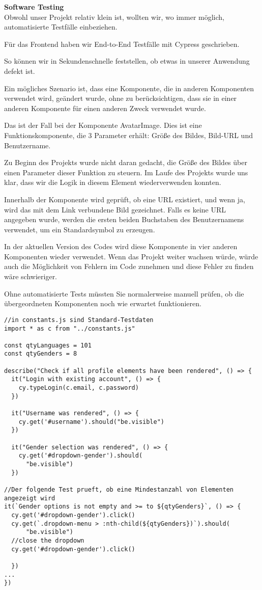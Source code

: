 \textbf{Software Testing }\\
Obwohl unser Projekt relativ klein ist, wollten wir, wo immer möglich, automatisierte Testfälle einbeziehen.

Für das Frontend haben wir End-to-End Testfälle mit Cypress geschrieben.

So können wir in Sekundenschnelle feststellen, ob etwas in unserer Anwendung defekt ist.

Ein mögliches Szenario ist, dass eine Komponente, die in anderen Komponenten verwendet wird, geändert wurde, ohne zu berücksichtigen, dass sie in einer anderen Komponente für einen anderen Zweck verwendet wurde.

Das ist der Fall bei der Komponente AvatarImage.
Dies ist eine Funktionskomponente, die 3 Parameter erhält: Größe des Bildes, Bild-URL und Benutzername.

Zu Beginn des Projekts wurde nicht daran gedacht, die Größe des Bildes über einen Parameter dieser Funktion zu steuern. Im Laufe des Projekts wurde uns klar, dass wir die Logik in diesem Element wiederverwenden konnten.

Innerhalb der Komponente wird geprüft, ob eine URL existiert, und wenn ja, wird das mit dem Link verbundene Bild gezeichnet. Falls es keine URL  angegeben wurde, werden die ersten beiden Buchstaben des Benutzernamens verwendet, um ein Standardsymbol zu erzeugen.

In der aktuellen Version des Codes wird diese Komponente in vier anderen Komponenten wieder verwendet.
Wenn das Projekt weiter wachsen würde, würde auch die Möglichkeit von Fehlern im Code zunehmen und diese Fehler zu finden wäre schwieriger.

Ohne automatisierte Tests müssten Sie normalerweise manuell prüfen, ob die übergeordneten Komponenten noch wie erwartet funktionieren.


\begin{lstlisting}
//in constants.js sind Standard-Testdaten
import * as c from "../constants.js"

const qtyLanguages = 101
const qtyGenders = 8

describe("Check if all profile elements have been rendered", () => {
  it("Login with existing account", () => {
    cy.typeLogin(c.email, c.password)
  })

  it("Username was rendered", () => {
    cy.get('#username').should("be.visible")
  })

  it("Gender selection was rendered", () => {
    cy.get('#dropdown-gender').should(
      "be.visible")
  })

//Der folgende Test prueft, ob eine Mindestanzahl von Elementen angezeigt wird  
it(`Gender options is not empty and >= to ${qtyGenders}`, () => {
  cy.get('#dropdown-gender').click()
  cy.get(`.dropdown-menu > :nth-child(${qtyGenders})`).should(
      "be.visible")
  //close the dropdown
  cy.get('#dropdown-gender').click()

  })
...
})

\end{lstlisting}

